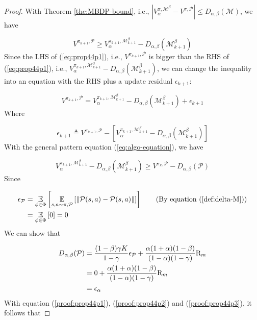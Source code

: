 \begin{proof}

With Theorem \ref{the:MBDP-bound}, i.e., $\left|{V}_\alpha^{\pi, \mathcal{M}^\beta}-{V}^{\pi, \mathcal{P}}\right|\leq D_{\alpha,\beta}(\mathcal{M})$, we have

\begin{equation}\label{eq:prop44p1}
{V}^{\pi_{k+1}, \mathcal{P}} \geq {V}_{\alpha}^{\pi_{k+1}, \mathcal{M}_{k+1}^\beta}-D_{\alpha,\beta}(\mathcal{M}_{k+1}^\beta)
\end{equation}
Since the LHS of (\ref{eq:prop44p1}), i.e., ${V}^{\pi_{k+1}, \mathcal{P}}$ is bigger than the RHS of (\ref{eq:prop44p1}), i.e., ${V}_{\alpha}^{\pi_{k+1}, \mathcal{M}_{k+1}^\beta}-D_{\alpha,\beta}(\mathcal{M}_{k+1}^\beta)$, we can change the inequality into an equation with the RHS plus a update residual $\epsilon_{k+1}$:

\begin{equation}\label{proof:prop44p1}
{V}^{\pi_{k+1}, \mathcal{P}} = {V}_{\alpha}^{\pi_{k+1}, \mathcal{M}_{k+1}^\beta}-D_{\alpha,\beta}(\mathcal{M}_{k+1}^\beta) + \epsilon_{k+1}
\end{equation}
Where

\begin{equation}
\epsilon_{k+1} \triangleq {V}^{\pi_{k+1}, \mathcal{P}} - \left[{V}_{\alpha}^{\pi_{k+1}, \mathcal{M}_{k+1}^\beta} - D_{\alpha,\beta}(\mathcal{M}_{k+1}^\beta)\right]
\end{equation}
With the general pattern equation (\ref{eq:algo-equation}), we have

\begin{equation}\label{proof:prop44p2}
{V}_{\alpha}^{\pi_{k+1}, \mathcal{M}_{k+1}^\beta}-D_{\alpha,\beta}(\mathcal{M}_{k+1}^\beta) \geq {V}^{\pi_k,\mathcal{P}}-D_{\alpha,\beta}(\mathcal{P})
\end{equation}
Since

\begin{align*}
\epsilon_{\mathcal{P}} &= \underset{\phi\in\Phi}{\mathbb{E}}\left[\underset{s,a\sim \pi,\mathcal{P}}{\mathbb{E}}\left[\left\|\mathcal{P}(s, a)-\mathcal{P}(s, a)\right\|\right]\right] \tag{By equation (\ref{def:delta-M})}\\
&=\underset{\phi\in\Phi}{\mathbb{E}}\left[0\right] = 0
\end{align*}
We can show that

\begin{align}
D_{\alpha,\beta}(\mathcal{P}) &= \frac{(1-\beta)\gamma K}{1-\gamma}\epsilon_{\mathcal{P}}+\frac{\alpha(1+\alpha)(1-\beta)}{(1-\alpha)(1-\gamma)}\mathrm{R}_m\notag\\
&=0+\frac{\alpha(1+\alpha)(1-\beta)}{(1-\alpha)(1-\gamma)}\mathrm{R}_m\notag\\
&=\epsilon_\alpha \label{proof:prop44p3}
\end{align}
With equation (\ref{proof:prop44p1}), (\ref{proof:prop44p2}) and (\ref{proof:prop44p3}), it follows that


\end{proof}
